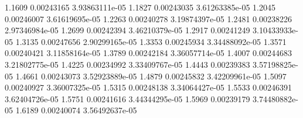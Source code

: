 1.1609 	0.00243165	3.93863111e-05
1.1827 	0.00243035	3.61263385e-05
1.2045 	0.00246007	3.61619695e-05
1.2263 	0.00240278	3.19874397e-05
1.2481 	0.00238226	2.97346984e-05
1.2699 	0.00242394	3.46210379e-05
1.2917 	0.00241249	3.10433933e-05
1.3135	0.00247656	2.90299165e-05
1.3353 	0.00245934	3.34488092e-05
1.3571 	0.00240421	 3.11858164e-05
1.3789 	0.00242184	3.36057714e-05
1.4007 	0.00244683	3.21802775e-05
1.4225 	0.00234992	 3.33409767e-05
1.4443 	0.00239383	3.57198825e-05
1.4661 	0.00243073	3.52923889e-05
1.4879	0.00245832	3.42209961e-05
1.5097 	0.00240927	3.36007325e-05
1.5315 	0.00248138	3.34064427e-05
1.5533 	0.00246391	3.62404726e-05
1.5751 	0.00241616	3.44344295e-05
1.5969	0.00239179	 3.74480882e-05
1.6189	0.00240074	3.56492637e-05